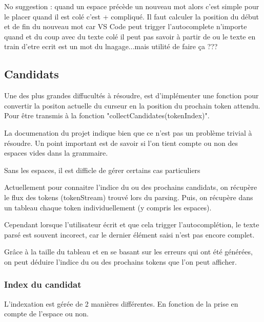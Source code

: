 \documentclass[
    iict, %
    il, %
]{heig-tb}
\begin{document}
No suggestion :
quand un espace précède un nouveau mot alors c'est simple pour le placer
quand il est colé c'est + compliqué. Il faut calculer la position du début et de fin du nouveau mot car VS Code peut trigger l'autocomplete n'importe quand et du coup
avec du texte colé il peut pas savoir à partir de ou le texte en train d'etre ecrit est un mot du lnagage...mais utilité de faire ça ???


\subsection{Candidats}\label{candidates}

Une des plus grandes diffucultés à résoudre, est d'implémenter une fonction pour convertir la positon actuelle du curseur en la position du prochain token attendu.
Pour être transmis à la fonction "collectCandidates(tokenIndex)". %

La documenation du projet indique bien que ce n'est pas un problème trivial à résoudre.
Un point important est de savoir si l'on tient compte ou non des espaces vides dans la grammaire.

Sans les espaces, il est difficle de gérer certains cas particuliers %



Actuellement pour connaitre l'indice du ou des prochains candidats, on récupère le flux des tokens (tokenStream) trouvé lors du parsing.
Puis, on récupère dans un tableau chaque token individuellement (y compris les espaces).

Cependant lorsque l'utilisateur écrit et que cela trigger l'autocomplétion, le texte parsé est souvent incorect, car le dernier élément saisi n'est pas encore complet.

Grâce à la taille du tableau et en se basant sur les erreurs qui ont été générées, on peut déduire l'indice du ou des prochains tokens que l'on peut afficher.

\subsubsection{Index du candidat}
L'indexation est gérée de 2 manières différentes. En fonction de la prise en compte de l'espace ou non.
\end{document}
